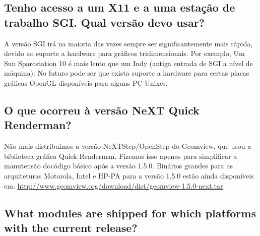 \documentclass[12pt,a4paper]{article}
\begin{document}
    \subsection{Tenho acesso a um X11 e a uma esta\c{c}\~ao de trabalho SGI. Qual vers\~ao devo usar?}

        A vers\~ao SGI ir\'a na maioria das vezes sempre ser significantemente mais r\'apida, devido ao
        suporte a hardware para gr\'aficos tridimensionais. Por exemplo, Um Sun Sparcstation 10 \'e
        mais lento que um Indy (antiga entrada de SGI a n\'ivel de m\'aquina). No futuro pode
        ser que exista suporte a hardware para certas placas gr\'aficas OpenGL dispon\'iveis para
        alguns PC Unixes.

    \subsection{O que ocorreu \`a vers\~ao NeXT Quick Renderman?}

        N\~ao mais distribuimos a vers\~ao NeXTStep/OpenStep do Geomview, que
        usou a biblioteca gr\'afica Quick Renderman. Fizemos isso apenas para simplificar
        a manutens\~ao doc\'{o}digo b\'asico ap\'{o}s a vers\~ao 1.5.0. Bin\'arios grandes para as arquiteturas
        Motorola, Intel e HP-PA para a vers\~ao 1.5.0 est\~ao ainda dispon\'iveis em:
        \url{http://www.geomview.org/download/dist/geomview-1.5.0-next.tar}.

    \subsection{What modules are shipped for which platforms with the current release?}
\end{document}
